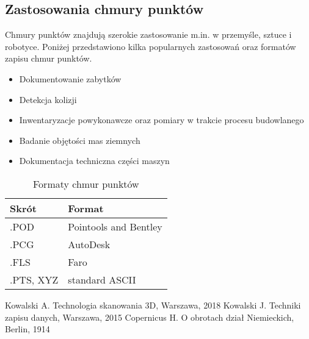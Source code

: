 \documentclass[12pt, a4paper,twocolumn]{article}%
\begin{document}
	\subsection{Zastosowania chmury punktów}
	Chmury punktów znajdują szerokie zastosowanie m.in. w przemyśle, sztuce i robotyce. Poniżej przedstawiono kilka popularnych zastosowań oraz formatów zapisu chmur punktów.			\cite{kowal2}\cite{hans1}

	\begin{itemize}
	\setlength\itemsep{0em} %
	\item Dokumentowanie zabytków
	\item Detekcja kolizji
	\item Inwentaryzacje powykonawcze oraz pomiary w trakcie procesu budowlanego
	\item Badanie objętości mas ziemnych
	\item Dokumentacja techniczna części maszyn
	\end{itemize}
	\begin{table}[h!]%
	\begin{tabularx}{0.6\textwidth} { |X|X| }
	\hline
	Skrót  & Format\\
	\hline
	.POD & Pointools and Bentley\\
	\hline
	.PCG & AutoDesk\\
	\hline
	.FLS & Faro\\
	\hline
	.PTS, XYZ & standard ASCII\\
	\hline

	\end{tabularx}
	\caption{Formaty chmur punktów}
	\end{table}
	
	\pagebreak %
	\onecolumn %
	\listoftables %
	\listoffigures %

	\begin{thebibliography}{9}
	 Kowalski A. Technologia skanowania 3D, Warszawa, 2018
	 Kowalski J. Techniki zapisu danych, Warszawa, 2015
	 Copernicus H. O obrotach dział Niemieckich, Berlin, 1914
	\end{thebibliography}
\end{document}
